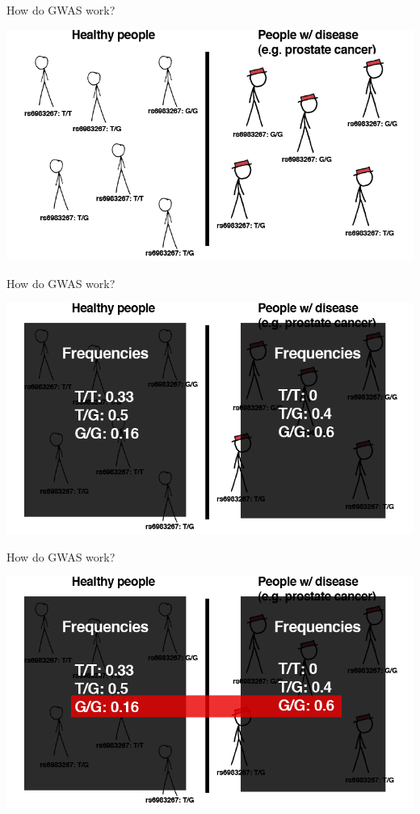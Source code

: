 \documentclass[12pt,a4paper]{beamer}
\begin{document}
\begin{frame}{How do GWAS work?}
\begin{center}
\includegraphics[scale=0.4]{gwas1.png} \\
\end{center}
\end{frame}

\begin{frame}{How do GWAS work?}
\begin{center}
\includegraphics[scale=0.4]{gwas2.png} \\
\end{center}
\end{frame}

\begin{frame}{How do GWAS work?}
\begin{center}
\includegraphics[scale=0.4]{gwas3.png} \\
\end{center}
\end{frame}
\end{document}
